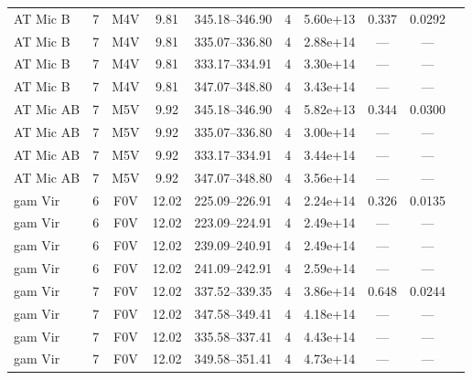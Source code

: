 \documentclass{openjournal}
\begin{document}
\begin{table}
\begin{tabularx}{\textwidth}{@{}l c c c c c c c c X@{}}
AT Mic B & 7 & M4V & 9.81 & 345.18--346.90 & 4 & 5.60e+13 & 0.337 & 0.0292 &  \\
AT Mic B & 7 & M4V & 9.81 & 335.07--336.80 & 4 & 2.88e+14 & --- & --- &  \\
AT Mic B & 7 & M4V & 9.81 & 333.17--334.91 & 4 & 3.30e+14 & --- & --- &  \\
AT Mic B & 7 & M4V & 9.81 & 347.07--348.80 & 4 & 3.43e+14 & --- & --- &  \\
AT Mic AB & 7 & M5V & 9.92 & 345.18--346.90 & 4 & 5.82e+13 & 0.344 & 0.0300 &  \\
AT Mic AB & 7 & M5V & 9.92 & 335.07--336.80 & 4 & 3.00e+14 & --- & --- &  \\
AT Mic AB & 7 & M5V & 9.92 & 333.17--334.91 & 4 & 3.44e+14 & --- & --- &  \\
AT Mic AB & 7 & M5V & 9.92 & 347.07--348.80 & 4 & 3.56e+14 & --- & --- &  \\
gam Vir & 6 & F0V & 12.02 & 225.09--226.91 & 4 & 2.24e+14 & 0.326 & 0.0135 &  \\
gam Vir & 6 & F0V & 12.02 & 223.09--224.91 & 4 & 2.49e+14 & --- & --- &  \\
gam Vir & 6 & F0V & 12.02 & 239.09--240.91 & 4 & 2.49e+14 & --- & --- &  \\
gam Vir & 6 & F0V & 12.02 & 241.09--242.91 & 4 & 2.59e+14 & --- & --- &  \\
gam Vir & 7 & F0V & 12.02 & 337.52--339.35 & 4 & 3.86e+14 & 0.648 & 0.0244 &  \\
gam Vir & 7 & F0V & 12.02 & 347.58--349.41 & 4 & 4.18e+14 & --- & --- &  \\
gam Vir & 7 & F0V & 12.02 & 335.58--337.41 & 4 & 4.43e+14 & --- & --- &  \\
gam Vir & 7 & F0V & 12.02 & 349.58--351.41 & 4 & 4.73e+14 & --- & --- &  \\
\hline
\end{tabularx}
\end{table}
\end{document}
